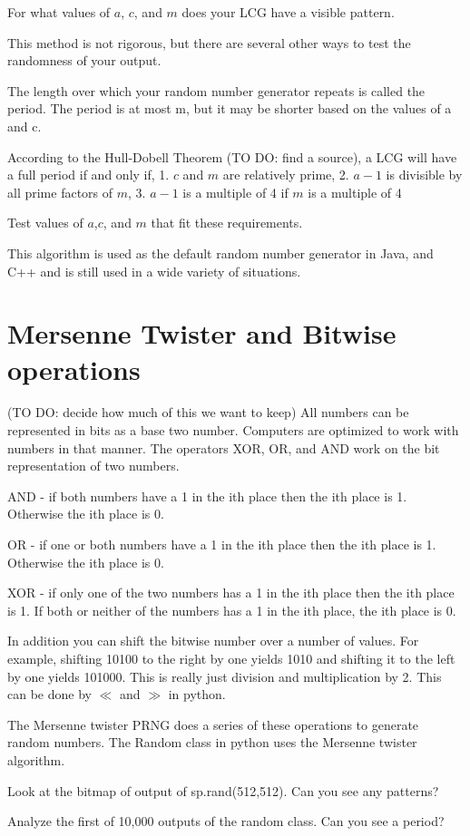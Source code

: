 \begin{problem}
For what values of $a$, $c$, and $m$ does your LCG have a visible pattern.
\end{problem}

This method is not rigorous, but there are several other ways to test the randomness of your output.

The length over which your random number generator repeats is called the period.
The period is at most m, but it may be shorter based on the values of a and c.
 
According to the Hull-Dobell Theorem (TO DO: find a source), a LCG will have a full period if and only if, 
1. $c$ and $m$ are relatively prime,
2. $a-1$ is divisible by all prime factors of $m$,
3. $a-1$ is a multiple of 4 if $m$ is a multiple of 4

\begin{problem}
Test values of $a$,$c$, and $m$ that fit these requirements. 
\end{problem}

This algorithm is used as the default random number generator in Java, and C++ and is still used in a wide variety of situations.

\section*{Mersenne Twister and Bitwise operations}

(TO DO: decide how much of  this we want to keep) All numbers can be represented in bits as a base two number.
Computers are optimized to work with numbers in that manner.
The operators XOR, OR, and AND work on the bit representation of two numbers.

AND - if both numbers have a 1 in the ith place then the ith place is 1.
Otherwise the ith place is 0.

OR - if one or both numbers have a 1 in the ith place then the ith place is 1.
Otherwise the ith place is 0.

XOR - if only one of the two numbers has a 1 in the ith place then the ith place is 1.
If both or neither of the numbers has a 1 in the ith place, the ith place is 0.

In addition you can shift the bitwise number over a number of values.
For example, shifting 10100 to the right by one yields 1010 and shifting it to the left by one yields 101000.
This is really just division and multiplication by 2.
This can be done by $\ll$ and $\gg$ in python. 

The Mersenne twister PRNG does a series of these operations to generate random numbers.
The Random class in python uses the Mersenne twister algorithm. 

\begin{problem}
Look at the bitmap of output of sp.rand(512,512).
Can you see any patterns?
\end{problem}

\begin{problem}
Analyze the first of 10,000 outputs of the random class.
Can you see a period?
\end{problem}
